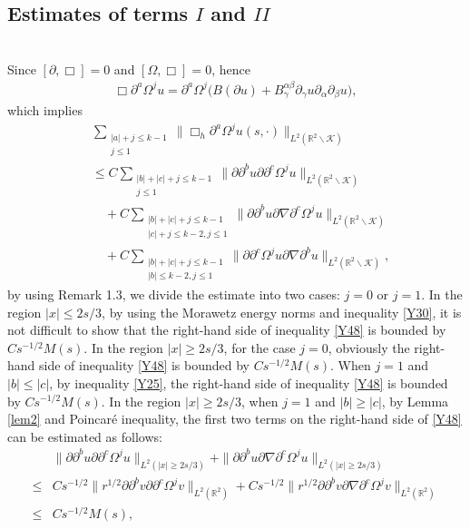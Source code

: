 \documentclass[11pt, reqno]{amsart}
\theoremstyle{definition}
\theoremstyle{remark}
\theoremstyle{definition}
\numberwithin{equation}{section}
\numberwithin{equation}{section}
\def\leq{\leqslant}
\def\geq{\geqslant}
\begin{document}
\subsection{Estimates of terms $I$ and $II$}
~\\
Since $[\partial,\Box]=0$ and $[\Omega,\Box]=0$, hence
\begin{align*}
\Box\partial^a\Omega^ju=\partial^a\Omega^j\big(B(\partial u)+B_{\gamma}^{\alpha\beta}\partial_{\gamma}u\partial_{\alpha}\partial_{\beta}u\big),
\end{align*}
which implies
\begin{align}\label{Y48}
&\sum_{\substack{|a|+j\leq
k-1\\j\leq1}}\|\Box_h\partial^a\Omega^ju(s,\cdot)\|_{L^2(\mathbb
R^2\backslash\mathcal {K})}\nonumber\\&\leq
C\sum_{\substack{|b|+|c|+j\leq
k-1\\j\leq1}}\|\partial\partial^bu\partial\partial^c\Omega^ju\|_{L^2(\mathbb
R^2\backslash\mathcal
{K})}\nonumber\\&\quad+C\sum_{\substack{|b|+|c|+j\leq k-1\\|c|+j\leq
k-2,j\leq1}}\|\partial\partial^bu\partial\nabla\partial^c\Omega^ju\|_{L^2(\mathbb
R^2\backslash\mathcal
{K})}\nonumber\\&\quad+C\sum_{\substack{|b|+|c|+j\leq k-1\\|b|\leq
k-2,j\leq1}}\|\partial\partial^c\Omega^ju\partial\nabla\partial^bu\|_{L^2(\mathbb
R^2\backslash\mathcal {K})},
\end{align}
by using Remark 1.3, we divide the estimate into two cases: $j=0$ or $j=1$. In the region $|x|\leq2s/3$, by using the
Morawetz energy norms and inequality \eqref{Y30}, it is not difficult
to show that the right-hand side of inequality \eqref{Y48} is
bounded by $Cs^{-1/2}M(s)$. In the region $|x|\geq2s/3$, for the case $j=0$, obviously the right-hand side of
inequality \eqref{Y48} is bounded by $Cs^{-1/2}M(s)$. When $j=1$ and
$|b|\leq|c|$, by inequality \eqref{Y25}, the right-hand side of
inequality \eqref{Y48} is bounded by $Cs^{-1/2}M(s)$. In the region
$|x|\geq2s/3$, when $j=1$ and $|b|\geq|c|$, by Lemma \ref{lem2} and Poincar\'{e}
inequality, the first two terms on the right-hand side of
\eqref{Y48} can be estimated as follows:
\begin{align*}
&\|\partial\partial^bu\partial\partial^c\Omega^ju\|_{L^2(|x|\geq2s/3)}
+\|\partial\partial^bu\partial\nabla\partial^c\Omega^ju\|_{L^2(|x|\geq2s/3)}
\\\leq &Cs^{-1/2}\|r^{1/2}\partial\partial^bv\partial\partial^c\Omega^jv\|_{L^2(\mathbb
R^2)}+Cs^{-1/2}\|r^{1/2}\partial\partial^bv\partial\nabla\partial^c\Omega^jv\|_{L^2(\mathbb
R^2)}
\\\leq& Cs^{-1/2}M(s),
\end{align*}
\end{document}
